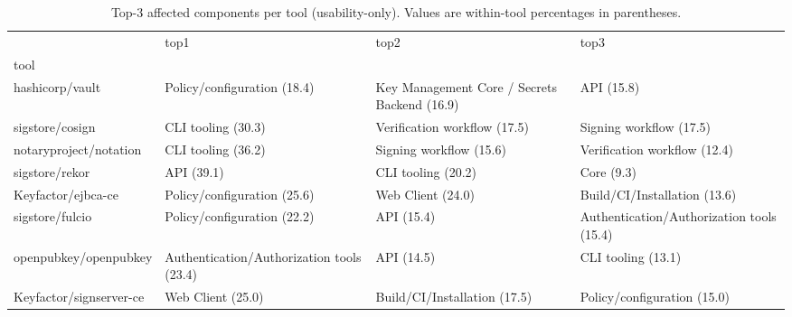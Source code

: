 \begin{table}[t]
\centering
\caption{Top-3 affected components per tool (usability-only). Values are within-tool percentages in parentheses.}
\label{tab:rq2-top3-components-by-tool}
\scriptsize
\begin{tabular}{llll}
\toprule
 & top1 & top2 & top3 \\
tool &  &  &  \\
\midrule
hashicorp/vault & Policy/configuration (18.4) & Key Management Core / Secrets Backend (16.9) & API (15.8) \\
sigstore/cosign & CLI tooling (30.3) & Verification workflow (17.5) & Signing workflow (17.5) \\
notaryproject/notation & CLI tooling (36.2) & Signing workflow (15.6) & Verification workflow (12.4) \\
sigstore/rekor & API (39.1) & CLI tooling (20.2) & Core (9.3) \\
Keyfactor/ejbca-ce & Policy/configuration (25.6) & Web Client (24.0) & Build/CI/Installation (13.6) \\
sigstore/fulcio & Policy/configuration (22.2) & API (15.4) & Authentication/Authorization tools (15.4) \\
openpubkey/openpubkey & Authentication/Authorization tools (23.4) & API (14.5) & CLI tooling (13.1) \\
Keyfactor/signserver-ce & Web Client (25.0) & Build/CI/Installation (17.5) & Policy/configuration (15.0) \\
\bottomrule
\end{tabular}

\end{table}
